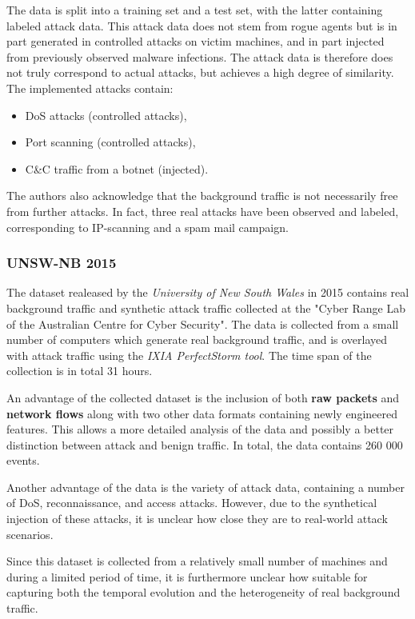 \documentclass[a4paper,12pt,twoside]{report}
\begin{document}
The data is split into a training set and a test set, with the latter containing labeled attack data. This attack data does not stem from rogue agents but is in part generated in controlled attacks on victim machines, and in part injected from previously observed malware infections. The attack data is therefore does not truly correspond to actual attacks, but achieves a high degree of similarity. The implemented attacks contain:
\begin{itemize}
\item DoS attacks (controlled attacks),
\item Port scanning (controlled attacks),
\item C\&C traffic from a botnet (injected).
\end{itemize}

The authors also acknowledge that the background traffic is not necessarily free from further attacks. In fact, three real attacks have been observed and labeled, corresponding to IP-scanning and a spam mail campaign.

\subsubsection*{UNSW-NB 2015 \cite{moustafa_unsw-nb15:_2015}}

The dataset realeased by the \textit{University of New South Wales} in 2015 contains real background traffic and synthetic attack traffic collected at the "Cyber Range Lab of the Australian Centre for Cyber Security". The data is collected from a small number of computers which generate real background traffic, and is overlayed with attack traffic using the \textit{IXIA PerfectStorm tool}. The time span of the collection is in total 31 hours.

An advantage of the collected dataset is the inclusion of both \textbf{raw packets} and \textbf{network flows} along with two other data formats containing newly engineered features. This allows a more detailed analysis of the data and possibly a better distinction between attack and benign traffic. In total, the data contains 260 000 events.

Another advantage of the data is the variety of attack data, containing a number of DoS, reconnaissance, and access attacks. However, due to the synthetical injection of these attacks, it is unclear how close they are to real-world attack scenarios.

Since this dataset is collected from a relatively small number of machines and during a limited period of time, it is furthermore unclear how suitable for capturing both the temporal evolution and the heterogeneity of real background traffic.
\end{document}
